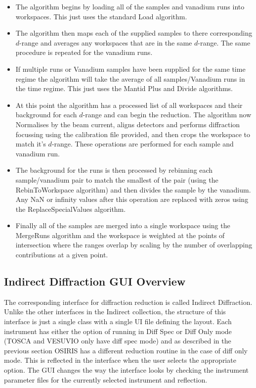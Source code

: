 \documentclass[paper=a4, fontsize=11pt]{scrartcl}	%
\numberwithin{equation}{section}															%
\numberwithin{figure}{section}																%
\numberwithin{table}{section}																%
\begin{document}
\begin{itemize}
\item The algorithm begins by loading all of the samples and vanadium runs into workspaces. This just uses the standard Load algorithm.

\item The algorithm then maps each of the supplied samples to there corresponding $d$-range and averages any workspaces that are in the same $d$-range. The same procedure is repeated for the vanadium runs.

\item If multiple runs or Vanadium samples have been supplied for the same time regime the algorithm will take the average of all samples/Vanadium runs in the time regime. This just uses the Mantid Plus and Divide algorithms. 

\item At this point the algorithm has a processed list of all workspaces and their background for each $d$-range and can begin the reduction. The algorithm now Normalises by the beam current, aligns detectors and performs diffraction focussing using the calibration file provided, and then crops the workspace to match it's $d$-range. These operations are performed for each sample and vanadium run.

\item The background for the runs is then processed by rebinning each sample/vanadium pair to match the smallest of the pair (using the RebinToWorkspace algorithm) and then divides the sample by the vanadium. Any NaN or infinity values after this operation are replaced with zeros using the ReplaceSpecialValues algorithm.

\item Finally all of the samples are merged into a single workspace using the MergeRuns algorithm and the workspace is weighted at the points of intersection where the ranges overlap by scaling by the number of overlapping contributions at a given point.
\end{itemize}

\subsection{Indirect Diffraction GUI Overview}
The corresponding interface for diffraction reduction is called Indirect Diffraction. Unlike the other interfaces in the Indirect collection, the structure of this interface is just a single class with a single UI file defining the layout. Each instrument has either the option of running in Diff Spec or Diff Only mode (TOSCA and VESUVIO only have diff spec mode) and as described in the previous section OSIRIS has a different reduction routine in the case of diff only mode. This is reflected in the interface when the user selects the appropriate option. The GUI changes the way the interface looks by checking the instrument parameter files for the currently selected instrument and reflection.
\end{document}
